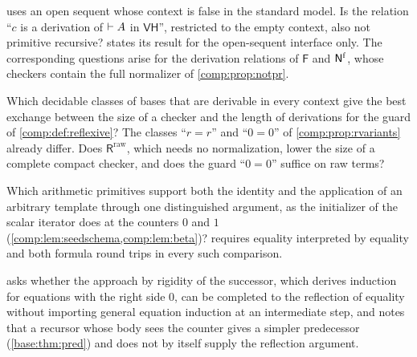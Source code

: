 \begin{question}
 uses an open sequent whose context is false in the
standard model. Is the relation ``$c$ is a derivation of $\vdash A$ in
$\mathsf{VH}$'', restricted to the empty context, also not primitive
recursive?  states its result for the open-sequent
interface only. The corresponding questions arise for the derivation
relations of $\mathsf F$ and $\mathsf{N}^{\mathrm f}$, whose checkers contain the
full normalizer of \cref{comp:prop:notpr}.
\end{question}

\begin{question}
Which decidable classes of bases that are derivable in every context give
the best exchange between the size of a checker and the length of
derivations for the guard of \cref{comp:def:reflexive}? The classes ``$r=r$''
and ``$0=0$'' of \cref{comp:prop:rvariants} already differ. Does
$\mathsf{R}^{\mathrm{raw}}$, which needs no normalization, lower the size of
a complete compact checker, and does the guard ``$0=0$'' suffice on raw
terms?
\end{question}

\begin{question}
Which arithmetic primitives support both the identity and the application
of an arbitrary template through one distinguished argument, as the
initializer of the scalar iterator does at the counters $0$ and $1$
(\cref{comp:lem:seedschema,comp:lem:beta})? 
requires equality interpreted by equality and both formula round trips in
every such comparison.
\end{question}

\begin{question}
 asks whether the approach by rigidity of the
successor, which derives induction for equations with the right side $0$,
can be completed to the reflection of equality without importing general
equation induction at an intermediate step, and notes that a recursor whose
body sees the counter gives a simpler predecessor (\cref{base:thm:pred}) and
does not by itself supply the reflection argument.
\end{question}

